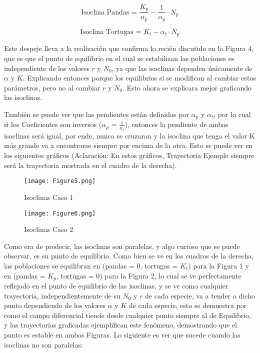 \documentclass{article}
\begin{document}
\begin{equation}
\text{Isoclina Pandas = } \frac{K_p}{\alpha_{p}} - \frac{1}{\alpha_{p}} \cdot N_p
\end{equation}

\begin{equation}
\text{Isoclina Tortugas = } K_t - \alpha_{t} \cdot N_p
\end{equation}
\vspace{0.75\baselineskip}

\noindent Este despeje lleva a la realización que confirma lo recién discutido en la Figura 4, que es que el punto de equilibrio en el cual se estabilizan las poblaciones es independiente de los valores $r$ y $N_0$, ya que las isoclinas dependen únicamente de $\alpha$ y $K$. Explicando entonces porque los equilibrios si se modifican al cambiar estos parámetros, pero no al cambiar $r$ y $N_0$. Esto ahora se explicara mejor graficando las isoclinas.

\noindent También se puede ver que las pendientes están definidas por $\alpha_p$ y $\alpha_t$, por lo cual si los Coeficientes son inversos ($\alpha_p$ = $\frac{1}{\alpha_t}$), entonces la pendiente de ambas isoclinas será igual, por ende, nunca se cruzaran y la isoclina que tenga el valor K más grande va a encontrarse siempre por encima de la otra. Esto se puede ver en los siguientes gráficos (Aclaración: En estos gráficos, Trayectoria Ejemplo siempre será la trayectoria mostrada en el cuadro de la derecha). 

\begin{figure}[ht]
    \centering
    \caption{Isoclinas Caso 1}
    \texttt{[image: Figure5.png]}
    \label{fig:Image 1.1}
\end{figure}

\begin{figure}[ht]
    \centering
    \caption{Isoclinas Caso 2}
    \texttt{[image: Figure6.png]}
    \label{fig:Image 1.1}
\end{figure}

\vspace{12.5\baselineskip}


\noindent Como era de predecir, las isoclinas son paralelas, y algo curioso que se puede observar, es su punto de equilibrio. Como bien se ve en los cuadros de la derecha, las poblaciones se equilibran en (pandas = 0, tortugas = $K_t$) para la Figura 1 y en (pandas = $K_p$, tortugas = 0) para la Figura 2, lo cual se ve perfectamente reflejado en el punto de equilibrio de las isoclinas, y se ve como cualquier trayectoria, independientemente de su $N_0$ y $r$ de cada especie, va a tender a dicho punto dependiendo de los valores $\alpha$ y $K$ de cada especie, esto se demuestra por como el campo diferencial tiende desde cualquier punto siempre al de Equilibrio, y las trayectorias graficadas ejemplifican este fenómeno, demostrando que el punto es estable en ambas Figuras. 
Lo siguiente es ver que sucede cuando las isoclinas no son paralelas:
\end{document}
